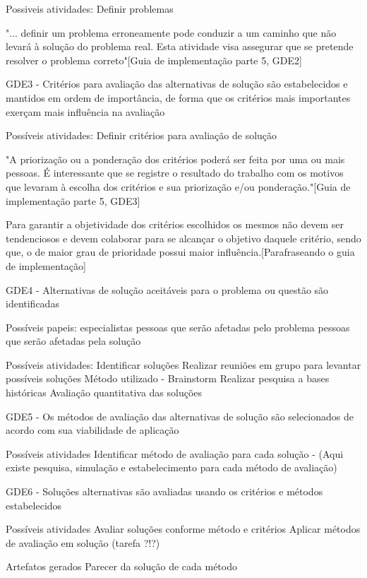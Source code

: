 \documentclass{article}
\begin{document}
		Possiveis atividades:
			Definir problemas
			
	"... definir um problema erroneamente pode conduzir a um caminho que não levará à solução do problema real. Esta atividade visa assegurar que se pretende resolver o problema correto"[Guia de implementação parte 5, GDE2]

	GDE3 - Critérios para avaliação das alternativas de solução são estabelecidos e mantidos em ordem de importância, de forma que os critérios mais importantes exerçam mais influência na avaliação
		
		Possíveis atividades:
			Definir critérios para avaliação de solução
			
		"A priorização ou a ponderação dos critérios poderá ser feita por uma ou mais pessoas. É interessante que se registre o resultado do trabalho com os motivos que levaram à escolha dos critérios e sua priorização e/ou ponderação."[Guia de implementação parte 5, GDE3]
		
		Para garantir a objetividade dos critérios escolhidos os mesmos não devem ser tendenciosos e devem colaborar para se alcançar o objetivo daquele critério, sendo que, o de maior grau de prioridade possui maior influência.[Parafraseando o guia de implementação]

	GDE4 - Alternativas de solução aceitáveis para o problema ou questão são identificadas
		
		Possíveis papeis:
			especialistas
			pessoas que serão afetadas pelo problema
			pessoas que serão afetadas pela solução
		
		Possíveis atividades:
			Identificar soluções
				Realizar reuniões em grupo para levantar possíveis soluções
					Método utilizado - Brainstorm
				Realizar pesquisa a bases históricas
			Avaliação quantitativa das soluções

	GDE5 - Os métodos de avaliação das alternativas de solução são selecionados de acordo com sua viabilidade de aplicação
	
		Possíveis atividades
			Identificar método de avaliação para cada solução - (Aqui existe pesquisa, simulação e estabelecimento para cada método de avaliação)	
	
	GDE6 - Soluções alternativas são avaliadas usando os critérios e métodos estabelecidos	
	
		Possíveis atividades
			Avaliar soluções conforme método e critérios
				Aplicar métodos de avaliação em solução (tarefa ?!?)
			
		Artefatos gerados
			Parecer da solução de cada método
	
\end{document}
